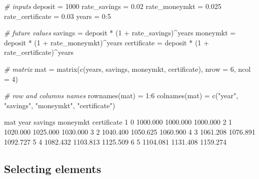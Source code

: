 \documentclass[
]{book}
\newenvironment{Shaded}{\begin{snugshade}}{\end{snugshade}}
\newcommand{\AttributeTok}[1]{\textcolor[rgb]{0.77,0.63,0.00}{#1}}
\newcommand{\CommentTok}[1]{\textcolor[rgb]{0.56,0.35,0.01}{\textit{#1}}}
\newcommand{\DecValTok}[1]{\textcolor[rgb]{0.00,0.00,0.81}{#1}}
\newcommand{\FloatTok}[1]{\textcolor[rgb]{0.00,0.00,0.81}{#1}}
\newcommand{\FunctionTok}[1]{\textcolor[rgb]{0.00,0.00,0.00}{#1}}
\newcommand{\NormalTok}[1]{#1}
\newcommand{\OtherTok}[1]{\textcolor[rgb]{0.56,0.35,0.01}{#1}}
\newcommand{\SpecialCharTok}[1]{\textcolor[rgb]{0.00,0.00,0.00}{#1}}
\newcommand{\StringTok}[1]{\textcolor[rgb]{0.31,0.60,0.02}{#1}}
\begin{document}
\begin{Shaded}
\begin{Highlighting}[]
\CommentTok{\# inputs}
\NormalTok{deposit }\OtherTok{=} \DecValTok{1000}
\NormalTok{rate\_savings }\OtherTok{=} \FloatTok{0.02}
\NormalTok{rate\_moneymkt }\OtherTok{=} \FloatTok{0.025}
\NormalTok{rate\_certificate }\OtherTok{=} \FloatTok{0.03}
\NormalTok{years }\OtherTok{=} \DecValTok{0}\SpecialCharTok{:}\DecValTok{5}

\CommentTok{\# future values}
\NormalTok{savings }\OtherTok{=}\NormalTok{ deposit }\SpecialCharTok{*}\NormalTok{ (}\DecValTok{1} \SpecialCharTok{+}\NormalTok{ rate\_savings)}\SpecialCharTok{\^{}}\NormalTok{years}
\NormalTok{moneymkt }\OtherTok{=}\NormalTok{ deposit }\SpecialCharTok{*}\NormalTok{ (}\DecValTok{1} \SpecialCharTok{+}\NormalTok{ rate\_moneymkt)}\SpecialCharTok{\^{}}\NormalTok{years}
\NormalTok{certificate }\OtherTok{=}\NormalTok{ deposit }\SpecialCharTok{*}\NormalTok{ (}\DecValTok{1} \SpecialCharTok{+}\NormalTok{ rate\_certificate)}\SpecialCharTok{\^{}}\NormalTok{years}

\CommentTok{\# matrix}
\NormalTok{mat }\OtherTok{=} \FunctionTok{matrix}\NormalTok{(}\FunctionTok{c}\NormalTok{(years, savings, moneymkt, certificate), }\AttributeTok{nrow =} \DecValTok{6}\NormalTok{, }\AttributeTok{ncol =} \DecValTok{4}\NormalTok{)}

\CommentTok{\# row and columns names}
\FunctionTok{rownames}\NormalTok{(mat) }\OtherTok{=} \DecValTok{1}\SpecialCharTok{:}\DecValTok{6}
\FunctionTok{colnames}\NormalTok{(mat) }\OtherTok{=} \FunctionTok{c}\NormalTok{(}\StringTok{"year"}\NormalTok{, }\StringTok{"savings"}\NormalTok{, }\StringTok{"moneymkt"}\NormalTok{, }\StringTok{"certificate"}\NormalTok{)}

\NormalTok{mat}
\NormalTok{  year  savings moneymkt certificate}
\DecValTok{1}    \DecValTok{0} \FloatTok{1000.000} \FloatTok{1000.000}    \FloatTok{1000.000}
\DecValTok{2}    \DecValTok{1} \FloatTok{1020.000} \FloatTok{1025.000}    \FloatTok{1030.000}
\DecValTok{3}    \DecValTok{2} \FloatTok{1040.400} \FloatTok{1050.625}    \FloatTok{1060.900}
\DecValTok{4}    \DecValTok{3} \FloatTok{1061.208} \FloatTok{1076.891}    \FloatTok{1092.727}
\DecValTok{5}    \DecValTok{4} \FloatTok{1082.432} \FloatTok{1103.813}    \FloatTok{1125.509}
\DecValTok{6}    \DecValTok{5} \FloatTok{1104.081} \FloatTok{1131.408}    \FloatTok{1159.274}
\end{Highlighting}
\end{Shaded}

\hypertarget{selecting-elements}{%
\subsection{Selecting elements}\label{selecting-elements}}
\end{document}

